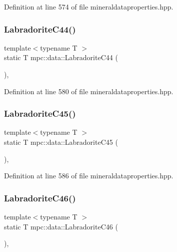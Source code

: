 Definition at line 574 of file mineraldataproperties.\+hpp.

\mbox{\label{namespacempc_1_1data_a2afe18008935a4c20161553bada047a9}} 
\subsubsection{\texorpdfstring{Labradorite\+C44()}{LabradoriteC44()}}
{\footnotesize\ttfamily template$<$typename T $>$ \\
static T mpc\+::data\+::\+Labradorite\+C44 (\begin{DoxyParamCaption}{ }\end{DoxyParamCaption})\hspace{0.3cm}{\ttfamily [inline]}, {\ttfamily [static]}}



Definition at line 580 of file mineraldataproperties.\+hpp.

\mbox{\label{namespacempc_1_1data_a48b4cfc6ba1ed9d206522e9d43f30ac6}} 
\subsubsection{\texorpdfstring{Labradorite\+C45()}{LabradoriteC45()}}
{\footnotesize\ttfamily template$<$typename T $>$ \\
static T mpc\+::data\+::\+Labradorite\+C45 (\begin{DoxyParamCaption}{ }\end{DoxyParamCaption})\hspace{0.3cm}{\ttfamily [inline]}, {\ttfamily [static]}}



Definition at line 586 of file mineraldataproperties.\+hpp.

\mbox{\label{namespacempc_1_1data_a5f2b3c336a7eb64940b49463cce37c11}} 
\subsubsection{\texorpdfstring{Labradorite\+C46()}{LabradoriteC46()}}
{\footnotesize\ttfamily template$<$typename T $>$ \\
static T mpc\+::data\+::\+Labradorite\+C46 (\begin{DoxyParamCaption}{ }\end{DoxyParamCaption})\hspace{0.3cm}{\ttfamily [inline]}, {\ttfamily [static]}}



